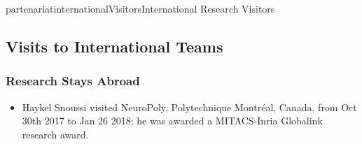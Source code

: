 \documentclass{ra2018}
\begin{document}
\begin{module}{partenariat}{internationalVisitors}{International Research Visitors}
\subsection{Visits to International Teams}









   \subsubsection{Research Stays Abroad}
   \begin{itemize}
     \item Haykel Snoussi visited NeuroPoly, Polytechnique Montréal, Canada, from Oct 30th 2017 to Jan 26 2018; he was awarded a MITACS-Inria Globalink research award.
   \end{itemize}






\end{module}


\end{document}
